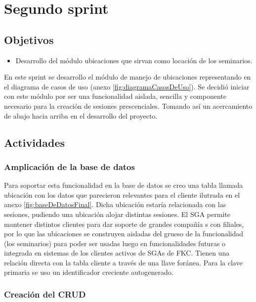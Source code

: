 \section{Segundo sprint} %
\label{sec:segundo_sprint}

\subsection{Objetivos}

\begin{itemize}
	\item Desarrollo del módulo ubicaciones que sirvan como locación de los seminarios.
\end{itemize}

En este sprint se desarrollo el módulo de manejo de ubicaciones representando en el diagrama de casos de uso (anexo \ref{fig:diagramaCasosDeUso}). Se decidió iniciar con este módulo por ser una funcionalidad aislada, sencilla y componente necesario para la creación de sesiones prescenciales. Tomando así un acercamiento de abajo hacia arriba en el desarrollo del proyecto.

\subsection{Actividades} %
\label{sub:actividades2}

\subsubsection{Amplicación de la base de datos}

Para soportar esta funcionalidad en la base de datos se creo una tabla llamada ubicación con los datos que parecieron relevantes para el cliente ilutrada en el anexo \ref{fig:baseDeDatosFinal}. Dicha ubicación estaría relacionada con las sesiones, pudiendo una ubicación alojar distintas sesiones. El SGA permite mantener distintos clientes para dar soporte de grandes compañía
s con filiales, por lo que las ubicaciones se construyen aisladas del grueso de la funcionalidad (los seminarios) para poder ser usadas luego en funcionalidades futuras o integrada en sistemas de los clientes activos de SGAs de FKC. Tienen una relación directa con la tabla cliente a través de una llave foránea. Para la clave primaria se uso un identificador creciente autogenerado.

\subsubsection{Creación del CRUD}

